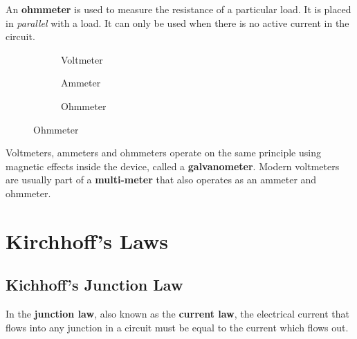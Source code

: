 An \textbf{ohmmeter} is used to measure the resistance of a particular load.
It is placed in \emph{parallel} with a load.
It can only be used when there is no active current in the circuit.
\begin{figure}[ht]
  \centering
  \begin{subfigure}{.32\textwidth}
    \centering
    \caption{Voltmeter}
    \label{fig:voltmeter}
  \end{subfigure}
  \begin{subfigure}{.32\textwidth}
    \centering
    \caption{Ammeter}
    \label{fig:ammeter}
  \end{subfigure}
  \begin{subfigure}{.32\textwidth}
    \centering
    \caption{Ohmmeter}
  \end{subfigure}
\end{figure}

Voltmeters, ammeters and ohmmeters operate on the same principle using magnetic
effects inside the device, called a \textbf{galvanometer}. Modern voltmeters
are usually part of a \textbf{multi-meter} that also operates as an ammeter
and ohmmeter.
\begin{figure}[ht]
  \centering
\end{figure}



\section{Kirchhoff's Laws}
%
\subsection{Kichhoff's Junction Law}
In the \textbf{junction law}, also known as the \textbf{current law}, the
electrical current that flows into any junction in a circuit must be equal to
the current which flows out.

